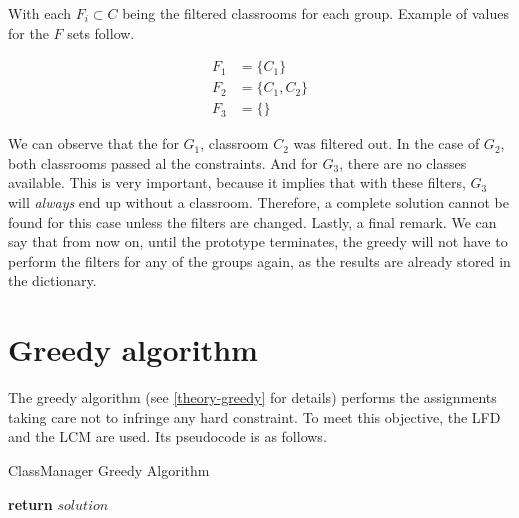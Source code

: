 With each $F_{i} \subset C$ being the filtered classrooms for each group. Example of values for the $F$ sets follow.

\begin{align}
    F_{1} &= \{ C_{1} \}\\
    F_{2} &= \{ C_{1}, C_{2} \}\\
    F_{3} &= \{ \}
\end{align}

We can observe that the for $G_{1}$, classroom $C_{2}$ was filtered out. In the case of $G_{2}$, both classrooms passed al the constraints. And for $G_{3}$, there are no classes available. This is very important, because it implies that with these filters, $G_{3}$ will \textit{always} end up without a classroom. Therefore, a complete solution cannot be found for this case unless the filters are changed. Lastly, a final remark. We can say that from now on, until the prototype terminates, the greedy will not have to perform the filters for any of the groups again, as the results are already stored in the dictionary. 



\section{Greedy algorithm}

The greedy algorithm (see \ref{theory-greedy} for details) performs the assignments taking care not to infringe any hard constraint. To meet this objective, the LFD and the LCM are used. Its pseudocode is as follows.

\begin{algorithm}[H]
    \caption{ClassManager Greedy Algorithm}
    \begin{algorithmic}[1]
                    \Else
                    \EndIf
                \EndIf
            \EndFor
            \State \textbf{return} $solution$
        \EndProcedure
    \end{algorithmic}
\end{algorithm}

